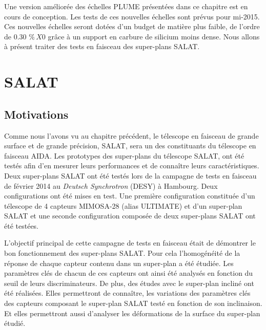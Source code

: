   \medskip
  
  Une version am\'elior\'ee des échelles PLUME pr\'esent\'ees dans ce chapitre est en cours de conception. Les tests de ces nouvelles \'echelles sont pr\'evus pour mi-2015. Ces nouvelles \'echelles seront dot\'ees d'un budget de mati\`ere plus faible, de l'ordre de 0.30 $\% \, X0$ grâce \`a un support en carbure de silicium moins dense. Nous allons \`a pr\'esent traiter des tests en faisceau des super-plans SALAT.

  
\section{SALAT}
  
  \subsection{Motivations}
  
  Comme nous l'avons vu au chapitre pr\'ec\'edent, le t\'elescope en faisceau de grande surface et de grande pr\'ecision, SALAT, sera un des constituants du t\'elescope en faisceau AIDA. Les prototypes des super-plans du t\'elescope SALAT, ont \'et\'e test\'es afin d'en mesurer leurs performances et de connaître leurs caract\'eristiques. Deux super-plans SALAT ont \'et\'e test\'es lors de la campagne de tests en faisceau de f\'evrier 2014 au \textit{Deutsch Synchrotron} (DESY) \`a Hambourg. Deux configurations ont \'et\'e mises en test. Une premi\`ere configuration constitu\'ee d'un t\'elescope de 4 capteurs MIMOSA-28 (alias ULTIMATE) et d'un super-plan SALAT et une seconde configuration compos\'ee de deux super-plans SALAT ont \'et\'e test\'ees.
  
  \medskip
  
  L'objectif principal de cette campagne de tests en faisceau \'etait de d\'emontrer le bon fonctionnement des super-plans SALAT. Pour cela l'homog\'en\'eit\'e de la r\'eponse de chaque capteur contenu dans un super-plan a \'et\'e \'etudi\'ee. Les param\`etres cl\'es de chacun de ces capteurs ont ainsi \'et\'e analys\'es en fonction du seuil de leurs discriminateurs. De plus, des \'etudes avec le super-plan inclin\'e ont \'et\'e r\'ealis\'ees. Elles permettront de conna\^itre, les variations des param\`etres cl\'es des capteurs composant le super-plan SALAT test\'e en fonction de son inclinaison. Et elles permettront aussi d'analyser les d\'eformations de la surface du super-plan \'etudi\'e.
  
